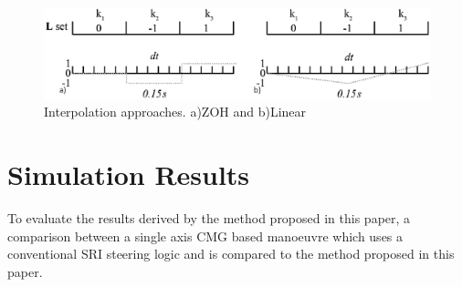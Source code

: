 \documentclass[journal]{new-aiaa}
\begin{document}
\begin{figure}[H]
\centering
\includegraphics[width=1\textwidth]{interptest.eps}
\caption{Interpolation approaches. a)ZOH and b)Linear}
\label{fig:interp}
\end{figure}


\section{Simulation Results}
To evaluate the results derived by the method proposed in this paper, a comparison between a single axis CMG based manoeuvre which uses a conventional SRI steering logic and is compared to the method proposed in this paper.
\end{document}
